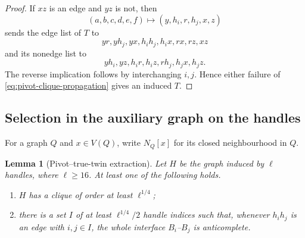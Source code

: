 \documentclass[11pt]{article}
\numberwithin{equation}{section}
\theoremstyle{plain}
\newtheorem{lemma}[theorem]{Lemma}
\theoremstyle{definition}
\begin{document}
\begin{proof}
If $xz$ is an edge and $yz$ is not, then
\[
 (a,b,c,d,e,f)\longmapsto(y,h_i,r,h_j,x,z)
\]
sends the edge list of $T$ to
\[
 yr,yh_j,yx,h_ih_j,h_ix,rx,rz,xz
\]
and its nonedge list to
\[
 yh_i,yz,h_ir,h_iz,rh_j,h_jx,h_jz.
\]
The reverse implication follows by interchanging $i,j$.  Hence either
failure of \eqref{eq:pivot-clique-propagation} gives an induced $T$.
\end{proof}

\subsection{Selection in the auxiliary graph on the handles}

For a graph $Q$ and $x\in V(Q)$, write $N_Q[x]$ for its closed
neighbourhood in $Q$.

\begin{lemma}[Pivot--true-twin extraction]
\label{lem:pivot-twin-extraction}
Let $H$ be the graph induced by $\ell$ handles, where $\ell\geq16$.
At least one of the following holds.
\begin{enumerate}
 \item $H$ has a clique of order at least $\ell^{1/4}$;
 \item there is a set $I$ of at least $\ell^{1/4}/2$ handle indices
       such that, whenever $h_ih_j$ is an edge with $i,j\in I$, the
       whole interface $B_i$--$B_j$ is anticomplete.
\end{enumerate}
\end{lemma}
\end{document}
